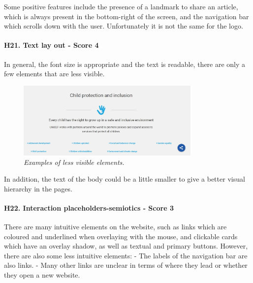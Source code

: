 \newline Some positive features include the presence of a landmark to share an article, which is always present in the bottom-right of the screen, and the navigation bar which scrolls down with the user. Unfortunately it is not the same for the logo.
\newline
\newline \paragraph{H21. Text lay out - Score 4}  \label{subsec:H21}	In general, the font size is appropriate and the text is readable, there are only a few elements that are less visible.
\begin{figure}[!h]
	\begin{center}
		\includegraphics[width=0.8\textwidth]{FinalScores24.jpg}
		\captionsetup{font=small}
		\caption{\textit{Examples of less visible elements.}}
	\end{center}
\end{figure}
\newline In addition, the text of the body could be a little smaller to give a better visual hierarchy in the pages.
\newline
\newline \paragraph{H22. Interaction placeholders-semiotics - Score 3}  \label{subsec:H22}	There are many intuitive elements on the website, such as links which are coloured and underlined when overlaying with the mouse, and clickable cards which have an overlay shadow, as well as textual and primary buttons.
\newline However, there are also some less intuitive elements:
\newline -	The labels of the navigation bar are also links.
\newline -	Many other links are unclear in terms of where they lead or whether they open a new website.

